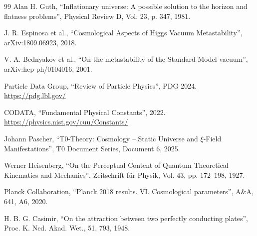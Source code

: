 \begin{thebibliography}{99}
		 Alan H. Guth, ``Inflationary universe: A possible solution to the horizon and flatness problems'', Physical Review D, Vol. 23, p. 347, 1981.
		
		 J. R. Espinosa et al., ``Cosmological Aspects of Higgs Vacuum Metastability'', arXiv:1809.06923, 2018.
		
		 V. A. Bednyakov et al., ``On the metastability of the Standard Model vacuum'', arXiv:hep-ph/0104016, 2001.
		
		 Particle Data Group, ``Review of Particle Physics'', PDG 2024. \url{https://pdg.lbl.gov/}
		
		 CODATA, ``Fundamental Physical Constants'', 2022. \url{https://physics.nist.gov/cuu/Constants/}
		
		 Johann Pascher, ``T0-Theory: Cosmology – Static Universe and $\xi$-Field Manifestations'', T0 Document Series, Document 6, 2025. 
		
		 Werner Heisenberg, ``On the Perceptual Content of Quantum Theoretical Kinematics and Mechanics'', Zeitschrift für Physik, Vol. 43, pp. 172–198, 1927.
		
		 Planck Collaboration, ``Planck 2018 results. VI. Cosmological parameters'', A\&A, 641, A6, 2020.
		
		 H. B. G. Casimir, ``On the attraction between two perfectly conducting plates'', Proc. K. Ned. Akad. Wet., 51, 793, 1948.
		
	\end{thebibliography}
